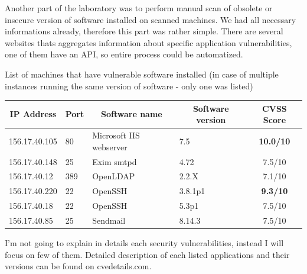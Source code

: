 \documentclass[a4paper, 11pt]{article}
\begin{document}
Another part of the laboratory was to perform manual scan of obsolete or insecure version of software installed on scanned machines.
We had all necessary informations already, therefore this part was rather simple. There are several websites thats aggregates information about specific application vulnerabilities, one of them have an API, so entire process could be automatized.

List of machines that have vulnerable software installed (in case of multiple instances running the same version of software - only one was listed)

\begin{table}[h]
  \centering
\begin{tabular}{|l|l|l|l|c|}
\hline
\multicolumn{1}{|c|}{IP Address} & \multicolumn{1}{c|}{Port} & \multicolumn{1}{c|}{Software name} & \multicolumn{1}{c|}{Software version} & CVSS Score                              \\ \hline
156.17.40.105                    & 80                        & Microsoft IIS webserver            & 7.5                                   & {\color[HTML]{FE0000} \textbf{10.0/10}} \\ \hline
156.17.40.148                    & 25                        & Exim smtpd                         & 4.72                                  & {\color[HTML]{F56B00} 7.5/10}           \\ \hline
156.17.40.12                     & 389                       & OpenLDAP                           & 2.2.X                                 & {\color[HTML]{F56B00} 7.1/10}           \\ \hline
156.17.40.220                    & 22                        & OpenSSH                            & 3.8.1p1                               & {\color[HTML]{FE0000} \textbf{9.3/10}}  \\ \hline
156.17.40.18                     & 22                        & OpenSSH                            & 5.3p1                                 & {\color[HTML]{F56B00} 7.5/10}           \\ \hline
156.17.40.85                     & 25                        & Sendmail                           & 8.14.3                                & {\color[HTML]{F56B00} 7.5/10}           \\ \hline
\end{tabular}
\end{table}


I'm not going to explain in details each security vulnerabilities, instead I will focus on few of them. Detailed description of each listed applications and their versions can be found on cvedetails.com. 
\end{document}
